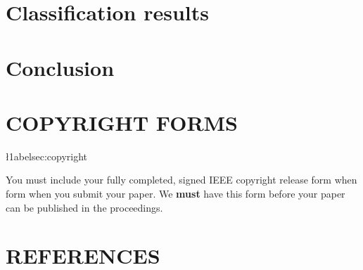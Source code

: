 \documentclass{article}
\begin{document}
\section{Classification results}
  \label{sec:Experiments}


\section{Conclusion}
  \label{sec:Conlusion}






\vfill
\pagebreak

\section{COPYRIGHT FORMS}
\l1abel{sec:copyright}

You must include your fully completed, signed IEEE copyright release form when
form when you submit your paper. We {\bf must} have this form before your paper
can be published in the proceedings.

\section{REFERENCES}
\label{sec:ref}
  



%
% 
\end{document}
